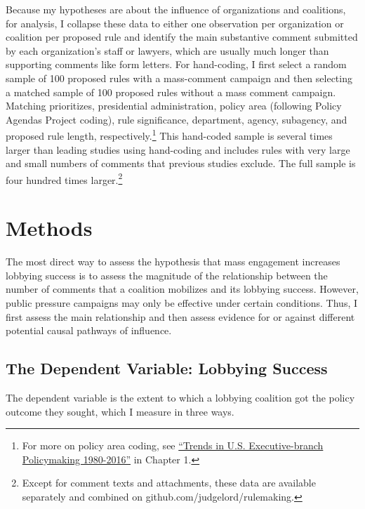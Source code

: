 \documentclass[
      12pt,
        ]{article}
\begin{document}
Because my hypotheses are about the influence of organizations and coalitions, for analysis, I collapse these data to either one observation per organization or coalition per proposed rule and identify the main substantive comment submitted by each organization's staff or lawyers, which are usually much longer than supporting comments like form letters. For hand-coding, I first select a random sample of 100 proposed rules with a mass-comment campaign and then selecting a matched sample of 100 proposed rules without a mass comment campaign. Matching prioritizes, presidential administration, policy area (following Policy Agendas Project coding), rule significance, department, agency, subagency, and proposed rule length, respectively.\footnote{For more on policy area coding, see \href{https://judgelord.github.io/dissertation/MacroRulemaking.pdf}{``Trends in U.S. Executive-branch Policymaking 1980-2016''} in Chapter 1.} This hand-coded sample is several times larger than leading studies using hand-coding and includes rules with very large and small numbers of comments that previous studies exclude. The full sample is four hundred times larger.\footnote{Except for comment texts and attachments, these data are available separately and combined on github.com/judgelord/rulemaking.}

\hypertarget{methods}{%
\section{Methods}\label{methods}}

The most direct way to assess the hypothesis that mass engagement increases lobbying success is to assess the magnitude of the relationship between the number of comments that a coalition mobilizes and its lobbying success. However, public pressure campaigns may only be effective under certain conditions. Thus, I first assess the main relationship and then assess evidence for or against different potential causal pathways of influence.

\hypertarget{the-dependent-variable-lobbying-success}{%
\subsection{The Dependent Variable: Lobbying Success}\label{the-dependent-variable-lobbying-success}}

The dependent variable is the extent to which a lobbying coalition got the policy outcome they sought, which I measure in three ways.
\end{document}
